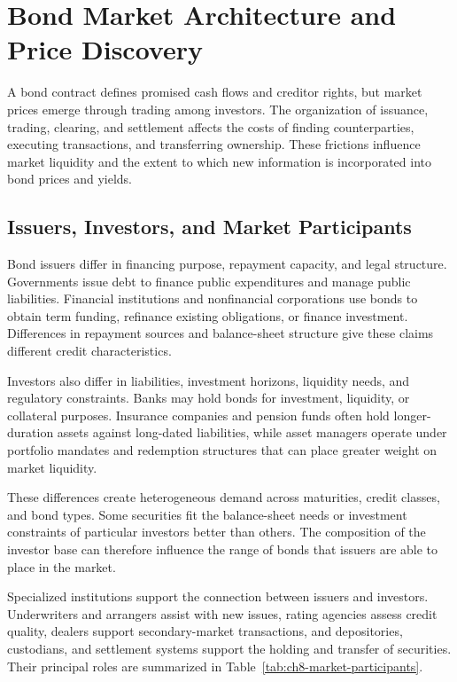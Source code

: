 \section{Bond Market Architecture and Price Discovery}

A bond contract defines promised cash flows and creditor rights, but market prices emerge through trading among investors. The organization of issuance, trading, clearing, and settlement affects the costs of finding counterparties, executing transactions, and transferring ownership. These frictions influence market liquidity and the extent to which new information is incorporated into bond prices and yields.

\subsection{Issuers, Investors, and Market Participants}

Bond issuers differ in financing purpose, repayment capacity, and legal structure. Governments issue debt to finance public expenditures and manage public liabilities. Financial institutions and nonfinancial corporations use bonds to obtain term funding, refinance existing obligations, or finance investment. Differences in repayment sources and balance-sheet structure give these claims different credit characteristics.

Investors also differ in liabilities, investment horizons, liquidity needs, and regulatory constraints. Banks may hold bonds for investment, liquidity, or collateral purposes. Insurance companies and pension funds often hold longer-duration assets against long-dated liabilities, while asset managers operate under portfolio mandates and redemption structures that can place greater weight on market liquidity.

These differences create heterogeneous demand across maturities, credit classes, and bond types. Some securities fit the balance-sheet needs or investment constraints of particular investors better than others. The composition of the investor base can therefore influence the range of bonds that issuers are able to place in the market.

Specialized institutions support the connection between issuers and investors. Underwriters and arrangers assist with new issues, rating agencies assess credit quality, dealers support secondary-market transactions, and depositories, custodians, and settlement systems support the holding and transfer of securities. Their principal roles are summarized in Table~\ref{tab:ch8-market-participants}.

